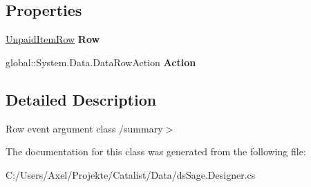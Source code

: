 \subsection*{Properties}
\begin{DoxyCompactItemize}
\item 
\hyperlink{class_products_1_1_data_1_1ds_sage_1_1_unpaid_item_row}{Unpaid\+Item\+Row} {\bfseries Row}\hypertarget{class_products_1_1_data_1_1ds_sage_1_1_unpaid_item_row_change_event_a71b9baf9feeeece9377dd68349bb90b0}{}\label{class_products_1_1_data_1_1ds_sage_1_1_unpaid_item_row_change_event_a71b9baf9feeeece9377dd68349bb90b0}

\item 
global\+::\+System.\+Data.\+Data\+Row\+Action {\bfseries Action}\hypertarget{class_products_1_1_data_1_1ds_sage_1_1_unpaid_item_row_change_event_ae502ea9af61ddfd8def6a9075752462f}{}\label{class_products_1_1_data_1_1ds_sage_1_1_unpaid_item_row_change_event_ae502ea9af61ddfd8def6a9075752462f}

\end{DoxyCompactItemize}


\subsection{Detailed Description}
Row event argument class /summary$>$ 

The documentation for this class was generated from the following file\+:\begin{DoxyCompactItemize}
\item 
C\+:/\+Users/\+Axel/\+Projekte/\+Catalist/\+Data/ds\+Sage.\+Designer.\+cs\end{DoxyCompactItemize}
